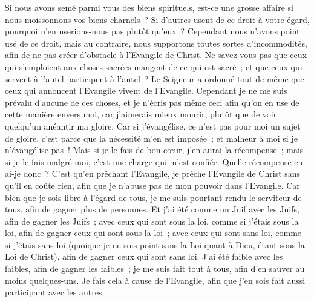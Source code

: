 \begin{multicols}{2}
Si nous avons semé parmi vous des biens spirituels, est-ce une grosse affaire si nous moissonnons vos biens charnels~?
Si d'autres usent de ce droit à votre égard, pourquoi n'en userions-nous pas plutôt qu'eux~? Cependant nous n'avons point usé de ce droit, mais au contraire, nous supportons toutes sortes d'incommodités, afin de ne pas créer d'obstacle à l'Evangile de Christ.
Ne savez-vous pas que ceux qui s'emploient aux choses sacrées mangent de ce qui est sacré~; et que ceux qui servent à l'autel participent à l'autel~?
Le Seigneur a ordonné tout de même que ceux qui annoncent l'Evangile vivent de l'Evangile.
Cependant je ne me suis prévalu d'aucune de ces choses, et je n'écris pas même ceci afin qu'on en use de cette manière envers moi, car j'aimerais mieux mourir, plutôt que de voir quelqu'un anéantir ma gloire.
Car si j'évangélise, ce n'est pas pour moi un sujet de gloire, c'est parce que la nécessité m'en est imposée~; et malheur à moi si je n'évangélise pas~!
Mais si je le fais de bon cœur, j'en aurai la récompense~; mais si je le fais malgré moi, c'est une charge qui m'est confiée.
Quelle récompense en ai-je donc~? C'est qu'en prêchant l'Evangile, je prêche l'Evangile de Christ sans qu'il en coûte rien, afin que je n'abuse pas de mon pouvoir dans l'Evangile.
Car bien que je sois libre à l'égard de tous, je me suis pourtant rendu le serviteur de tous, afin de gagner plus de personnes.
Et j'ai été comme un Juif avec les Juifs, afin de gagner les Juifs~; avec ceux qui sont sous la loi, comme si j'étais sous la loi, afin de gagner ceux qui sont sous la loi~;
avec ceux qui sont sans loi, comme si j'étais sans loi (quoique je ne sois point sans la Loi quant à Dieu, étant sous la Loi de Christ), afin de gagner ceux qui sont sans loi.
J'ai été faible avec les faibles, afin de gagner les faibles~; je me suis fait tout à tous, afin d'en sauver au moins quelques-uns.
Je fais cela à cause de l'Evangile, afin que j'en sois fait aussi participant avec les autres.

\end{multicols}
